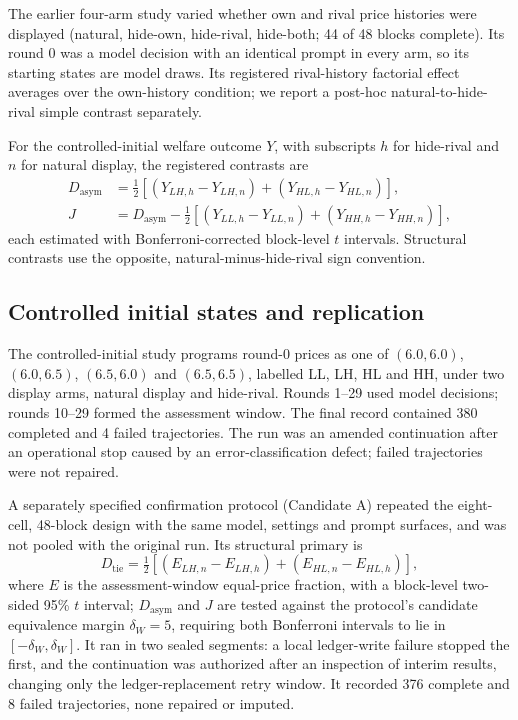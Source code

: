 \documentclass[sigconf,review,anonymous]{acmart}
\begin{document}
The earlier four-arm study varied whether own and rival price histories were displayed (natural, hide-own, hide-rival, hide-both; 44 of 48 blocks complete). Its round 0 was a model decision with an identical prompt in every arm, so its starting states are model draws. Its registered rival-history factorial effect averages over the own-history condition; we report a post-hoc natural-to-hide-rival simple contrast separately.

For the controlled-initial welfare outcome $Y$, with subscripts $h$ for hide-rival and $n$ for natural display, the registered contrasts are
\begin{align*}
D_{\mathrm{asym}}&=\tfrac{1}{2}[(Y_{LH,h}-Y_{LH,n})+(Y_{HL,h}-Y_{HL,n})],\\
J&=D_{\mathrm{asym}}-\tfrac{1}{2}[(Y_{LL,h}-Y_{LL,n})+(Y_{HH,h}-Y_{HH,n})],
\end{align*}
each estimated with Bonferroni-corrected block-level $t$ intervals. Structural contrasts use the opposite, natural-minus-hide-rival sign convention.

\subsection{Controlled initial states and replication}

The controlled-initial study programs round-0 prices as one of $(6.0,6.0)$, $(6.0,6.5)$, $(6.5,6.0)$ and $(6.5,6.5)$, labelled LL, LH, HL and HH, under two display arms, natural display and hide-rival. Rounds 1--29 used model decisions; rounds 10--29 formed the assessment window. The final record contained 380 completed and 4 failed trajectories. The run was an amended continuation after an operational stop caused by an error-classification defect; failed trajectories were not repaired.

A separately specified confirmation protocol (Candidate A) repeated the eight-cell, 48-block design with the same model, settings and prompt surfaces, and was not pooled with the original run. Its structural primary is
\[
D_{\mathrm{tie}}=\tfrac{1}{2}[(E_{LH,n}-E_{LH,h})+(E_{HL,n}-E_{HL,h})],
\]
where $E$ is the assessment-window equal-price fraction, with a block-level two-sided 95\% $t$ interval; $D_{\mathrm{asym}}$ and $J$ are tested against the protocol's candidate equivalence margin $\delta_W=5$, requiring both Bonferroni intervals to lie in $[-\delta_W,\delta_W]$. It ran in two sealed segments: a local ledger-write failure stopped the first, and the continuation was authorized after an inspection of interim results, changing only the ledger-replacement retry window. It recorded 376 complete and 8 failed trajectories, none repaired or imputed.
\end{document}
